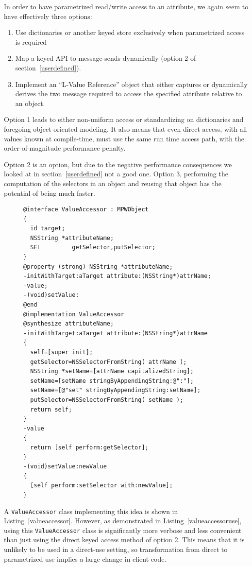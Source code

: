 \documentclass[preprint]{sigplanconf}
\begin{document}
In order to have parametrized read/write access to an attribute, we again seem to have effectively
three options:

\begin{enumerate}
\item Use dictionaries or another keyed store exclusively when parametrized access is required
\item Map a keyed API to message-sends dynamically (option 2 of section~\ref{userdefined}).
\item Implement an ``L-Value Reference'' object that either captures or dynamically derives 
	the two message required to access the specified attribute relative to an object.
\end{enumerate}


Option 1 leads to either non-uniform access or standardizing on dictionaries and foregoing 
object-oriented modeling.   It also means that even direct access, with all values known
at compile-time, must use the same run time access path, with the order-of-magnitude
performance penalty.
 
Option 2 is an option, but due to the negative performance
consequences we looked at in
section~\ref{userdefined} not a good one.   Option 3,  performing the computation of the selectors
in an object and reusing that object has the potential of being much faster. 

\begin{figure}[htbp]
\begin{lstlisting}[style=numbers,label=valueaccessor,caption=Class encapsulating message-based attribute access.]
@interface ValueAccessor : MPWObject
{
  id target;
  NSString *attributeName;
  SEL         getSelector,putSelector;
}
@property (strong) NSString *attributeName;
-initWithTarget:aTarget attribute:(NSString*)attrName;
-value;
-(void)setValue:
@end
@implementation ValueAccessor
@synthesize attributeName;
-initWithTarget:aTarget attribute:(NSString*)attrName
{
  self=[super init];
  getSelector=NSSelectorFromString( attrName );
  NSString *setName=[attrName capitalizedString];
  setName=[setName stringByAppendingString:@":"];
  setName=[@"set" stringByAppendingString:setName];
  putSelector=NSSelectorFromString( setName );
  return self;
}
-value
{
  return [self perform:getSelector];
}
-(void)setValue:newValue
{
  [self perform:setSelector with:newValue];
}
\end{lstlisting}
\end{figure}

A {\tt ValueAccessor} class implementing this idea is shown in Listing~\ref{valueaccessor}.  However, 
as demonstrated in Listing~\ref{valueaccessoruse}, using this
{\tt ValueAccessor} class is significantly more verbose and less convenient than just using the 
direct keyed access method of option 2.  This means that it is unlikely to be used in a direct-use
setting, so transformation from direct to parametrized use implies a large change in client code.
\end{document}
